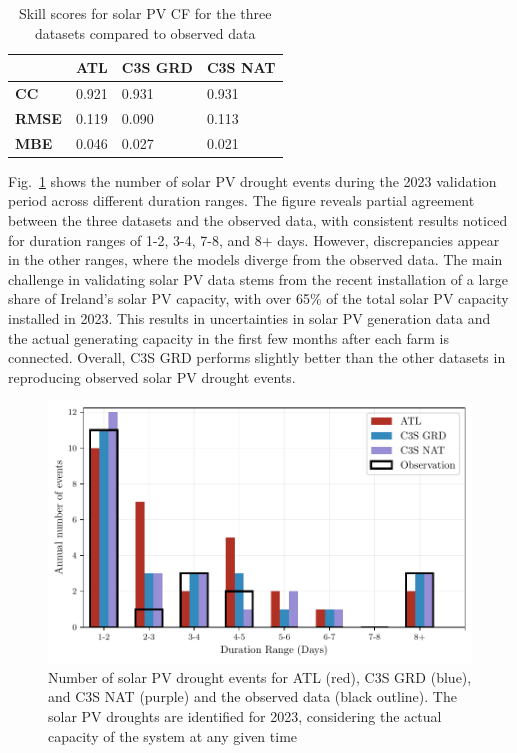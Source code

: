 \documentclass[preprint, 12pt]{elsarticle}
\begin{document}
\begin{table}[!ht]
	\centering
	\begin{tabular}{l|lll|}
		\cline{2-4}
		& \textbf{ATL} & \textbf{C3S GRD} & \textbf{C3S NAT} \\ \hline
		\multicolumn{1}{|l|}{\textbf{CC}}   & 0.921           & 0.931            & 0.931            \\ \hline
		\multicolumn{1}{|l|}{\textbf{RMSE}} & 0.119           & 0.090            & 0.113            \\ \hline
		\multicolumn{1}{|l|}{\textbf{MBE}}   & 0.046           & 0.027           & 0.021           \\ \hline
	\end{tabular}
	\caption{Skill scores for solar PV CF for the three datasets compared to observed data}
	\label{tab:pv_skill_scores}
\end{table}

Fig.~\ref{fig:bar_number_events_verification_pv} shows the number of solar PV drought events during the 2023 validation period across different duration ranges. The figure reveals partial agreement between the three datasets and the observed data, with consistent results noticed for duration ranges of 1-2, 3-4, 7-8, and 8+ days. However, discrepancies appear in the other ranges, where the models diverge from the observed data. The main challenge in validating solar PV data stems from the recent installation of a large share of Ireland’s solar PV capacity, with over 65\% of the total solar PV capacity installed in 2023. This results in uncertainties in solar PV generation data and the actual generating capacity in the first few months after each farm is connected. Overall, C3S GRD performs slightly better than the other datasets in reproducing observed solar PV drought events.

\begin{figure}[!ht]
	\centering
	\includegraphics[width=\textwidth]{verification_pv_number_events.pdf}
	\caption{Number of solar PV drought events for ATL (red), C3S GRD (blue), and C3S NAT (purple) and the observed data (black outline). The solar PV droughts are identified for 2023, considering the actual capacity of the system at any given time}
	\label{fig:bar_number_events_verification_pv}
\end{figure}
\end{document}
